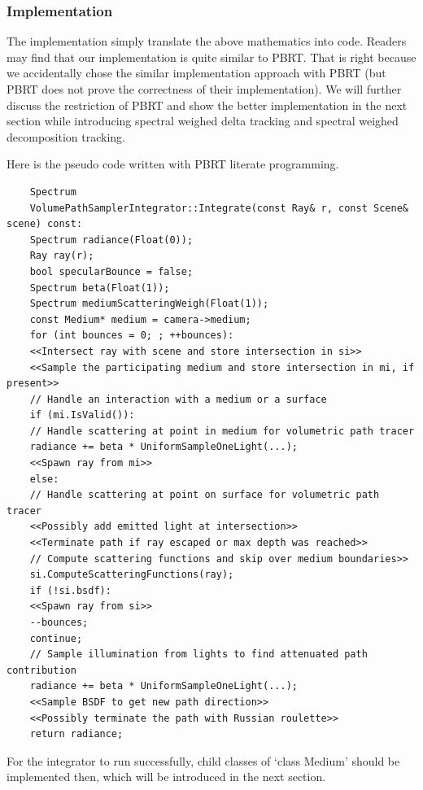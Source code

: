 \documentclass[acmtog]{acmart}
\begin{document}
\subsubsection{Implementation}
The implementation simply translate the above mathematics into code.
Readers may find that our implementation is quite similar to PBRT.
That is right because we accidentally chose the similar implementation approach with PBRT (but PBRT does not prove the correctness of their implementation).
We will further discuss the restriction of PBRT and show the better implementation in the next section 
while introducing spectral weighed delta tracking and spectral weighed decomposition tracking.\par
Here is the pseudo code written with PBRT literate programming.
\lstset{basicstyle=\tiny\ttfamily}
\begin{lstlisting}
	Spectrum
	VolumePathSamplerIntegrator::Integrate(const Ray& r, const Scene& scene) const:
	Spectrum radiance(Float(0));
	Ray ray(r);
	bool specularBounce = false;
	Spectrum beta(Float(1));
	Spectrum mediumScatteringWeigh(Float(1));
	const Medium* medium = camera->medium;
	for (int bounces = 0; ; ++bounces):
	<<Intersect ray with scene and store intersection in si>>
	<<Sample the participating medium and store intersection in mi, if present>>
	// Handle an interaction with a medium or a surface
	if (mi.IsValid()):
	// Handle scattering at point in medium for volumetric path tracer
	radiance += beta * UniformSampleOneLight(...);
	<<Spawn ray from mi>>
	else:
	// Handle scattering at point on surface for volumetric path tracer
	<<Possibly add emitted light at intersection>>
	<<Terminate path if ray escaped or max depth was reached>>
	// Compute scattering functions and skip over medium boundaries>>
	si.ComputeScatteringFunctions(ray);
	if (!si.bsdf):
	<<Spawn ray from si>>
	--bounces;
	continue;
	// Sample illumination from lights to find attenuated path contribution
	radiance += beta * UniformSampleOneLight(...);
	<<Sample BSDF to get new path direction>>
	<<Possibly terminate the path with Russian roulette>>
	return radiance;
\end{lstlisting}
\lstset{basicstyle=\small\ttfamily}
For the integrator to run successfully, child classes of `class Medium' should be implemented then, 
which will be introduced in the next section.
\end{document}

